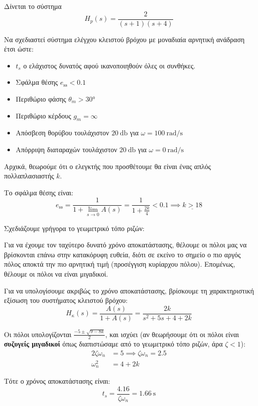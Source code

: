 \documentclass[11pt,a4paper,notitlepage,fleqn]{article}
\begin{document}
\begin{exercise}
Δίνεται το σύστημα
\[
H_p(s) = \frac{2}{(s+1)(s+4)}
\]

Να σχεδιαστεί σύστημα ελέγχου κλειστού βρόχου με μοναδιαία αρνητική ανάδραση έτσι ώστε:
\begin{itemize}
	\item \( t_s \) ο ελάχιστος δυνατός αφού ικανοποιηθούν όλες οι συνθήκες.
	\item Σφάλμα θέσης \( e_{\mathrm{ss}} < 0.1 \)
	\item Περιθώριο φάσης \( \theta_m > \ang{30} \)
	\item Περιθώριο κέρδους \( g_m = \infty \)
	\item Απόσβεση θορύβου τουλάχιστον \( \SI{20}{\decibel} \) για \( \omega = \SI{100}{\radian/\second} \)
	\item Απόρριψη διαταραχών τουλάχιστον \( \SI{20}{\decibel} \) για \( \omega = \SI{0}{\radian/\second} \)
\end{itemize}

\tcblower
Αρχικά, θεωρούμε ότι ο ελεγκτής που προσθέτουμε θα είναι ένας απλός πολλαπλασιαστής \( k \).

Το σφάλμα θέσης είναι:
\[
e_{\mathrm{ss}} = \frac{1}{1+ \lim_{s\to 0} A(s)}
= \frac{1}{1+\frac{2k}{4}} < 0.1 \implies \underline{k > 18}
\]

Σχεδιάζουμε γρήγορα το γεωμετρικό τόπο ριζών:

Για να έχουμε τον ταχύτερο δυνατό χρόνο αποκατάστασης, θέλουμε οι πόλοι μας να βρίσκονται
επάνω στην κατακόρυφη ευθεία, διότι σε εκείνο το σημείο ο πιο αργός πόλος αποκτά την
πιο αρνητική τιμή (προσέγγιση κυρίαρχου πόλου). Επομένως, θέλουμε οι πόλοι να είναι μιγαδικοί.

Για να υπολογίσουμε ακριβώς το χρόνο αποκατάστασης, βρίσκουμε τη χαρακτηριστική εξίσωση
του συστήματος κλειστού βρόχου:
\[
H_\kappa(s) = \frac{A(s)}{1+A(s)} = \frac{2k}{s^2+5s+4+2k}
\]

Οι πόλοι υπολογίζονται \( \frac{-5\pm\sqrt{9-8k}}{2} \), και ισχύει (αν θεωρήσουμε ότι
οι πόλοι είναι \textbf{συζυγείς μιγαδικοί} όπως διαπιστώσαμε από το γεωμετρικό τόπο
ριζών, άρα \( ζ < 1 \)):
\begin{align*}
	2ζ\omega_ n &= 5 \implies ζ\omega_n = 2.5 \\
	\omega_n^2 &= 4+2k
\end{align*}

Τότε ο χρόνος αποκατάστασης είναι:
\[
t_s = \frac{4.16}{ζ\omega_n} = \SI{1.66}{\second}
\]


\end{exercise}
\end{document}
